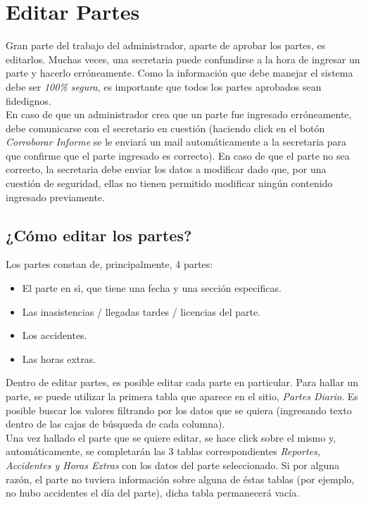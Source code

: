 \documentclass[12pt,a4paper]{article}
\begin{document}
\section{Editar Partes}
Gran parte del trabajo del administrador, aparte de aprobar los partes, es editarlos. Muchas veces, una secretaria puede confundirse a la hora de ingresar un parte y hacerlo erróneamente. Como la información que debe manejar el sistema debe ser \textit{100\% segura}, es importante que todos los partes aprobados sean fidedignos. \\ 
En caso de que un administrador crea que un parte fue ingresado erróneamente, debe comunicarse con el secretario en cuestión (haciendo click en el botón \textit{Corroborar Informe} se le enviará un mail automáticamente a la secretaria para que confirme que el parte ingresado es correcto). En caso de que el parte no sea correcto, la secretaria debe enviar los datos a modificar dado que, por una cuestión de seguridad, ellas no tienen permitido modificar ningún contenido ingresado previamente.

\subsection{¿Cómo editar los partes?}
Los partes constan de, principalmente, 4 partes:
\begin{itemize}
	\item El parte en sì, que tiene una fecha y una sección especificas.
	\item Las inasistencias / llegadas tardes / licencias del parte.
	\item Los accidentes.
	\item Las horas extras.
\end{itemize}
Dentro de editar partes, es posible editar cada parte en particular. Para hallar un parte, se puede utilizar la primera tabla que aparece en el sitio, \textit{Partes Diario}. Es posible buscar los valores filtrando por los datos que se quiera (ingresando texto dentro de las cajas de búsqueda de cada columna).\\
Una vez hallado el parte que se quiere editar, se hace click sobre el mismo y, automáticamente, se completarán las 3 tablas correspondientes \textit{Reportes, Accidentes y Horas Extras} con los datos del parte seleccionado. Si por alguna razón, el parte no tuviera información sobre alguna de éstas tablas (por ejemplo, no hubo accidentes el día del parte), dicha tabla permanecerá vacía.
\end{document}
